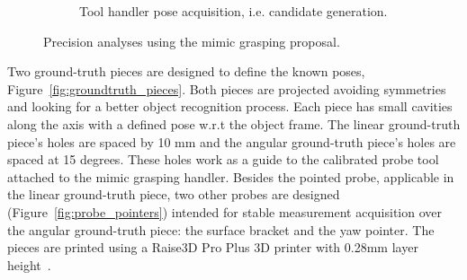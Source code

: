 \begin{figure}[h!]
{\begin{tcolorbox}
\begin{subfigure}[c]{.8\textwidth}
          \caption{Tool handler pose acquisition, i.e. candidate generation.}
          \label{fig:mimic_grasping_test_demo}
      \end{subfigure}
     \end{tcolorbox}
     \caption{Precision analyses using the mimic grasping proposal.}
     \label{fig:mimic_grapsing_procedure}
   }%
 \end{figure}


Two ground-truth pieces are designed to define the known poses, Figure~\ref{fig:groundtruth_pieces}. Both pieces are projected avoiding symmetries and looking for a better object recognition process. Each piece has small cavities along the axis with a defined pose w.r.t the object frame. The linear ground-truth piece's holes are spaced by 10 mm and the angular ground-truth piece's holes are spaced at 15 degrees. These holes work as a guide to the calibrated probe tool attached to the mimic grasping handler. Besides the pointed probe, applicable in the linear ground-truth piece, two other probes are designed (Figure~\ref{fig:probe_pointers}) intended for stable measurement acquisition over the angular ground-truth piece: the surface bracket and the yaw pointer. The pieces are printed using a Raise3D Pro Plus 3D printer with 0.28mm layer height~\cite{impressora3d}.


